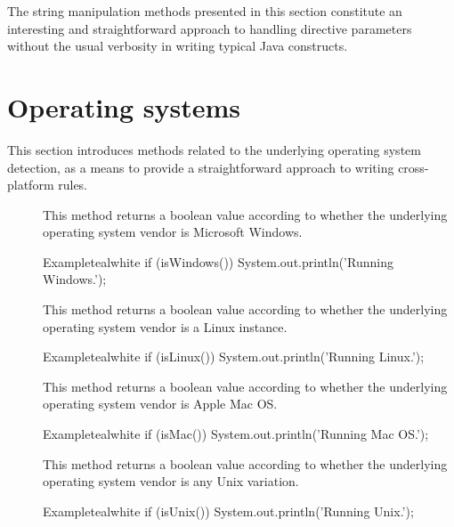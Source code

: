 The string manipulation methods presented in this section constitute an interesting and straightforward approach to handling directive parameters without the usual verbosity in writing typical Java constructs.

\section{Operating systems}
\label{sec:operatingsystems}

This section introduces methods related to the underlying operating system detection, as a means to provide a straightforward approach to writing cross-platform rules.

\begin{description}
\item[] This method returns a boolean value according to whether the underlying operating system vendor is Microsoft Windows.

\begin{codebox}{Example}{teal}{\icnote}{white}
if (isWindows()) { System.out.println('Running Windows.'); }
\end{codebox}

\item[] This method returns a boolean value according to whether the underlying operating system vendor is a Linux instance.

\begin{codebox}{Example}{teal}{\icnote}{white}
if (isLinux()) { System.out.println('Running Linux.'); }
\end{codebox}

\item[] This method returns a boolean value according to whether the underlying operating system vendor is Apple Mac OS.

\begin{codebox}{Example}{teal}{\icnote}{white}
if (isMac()) { System.out.println('Running Mac OS.'); }
\end{codebox}

\item[] This method returns a boolean value according to whether the underlying operating system vendor is any Unix variation.

\begin{codebox}{Example}{teal}{\icnote}{white}
if (isUnix()) { System.out.println('Running Unix.'); }
\end{codebox}


\end{description}
